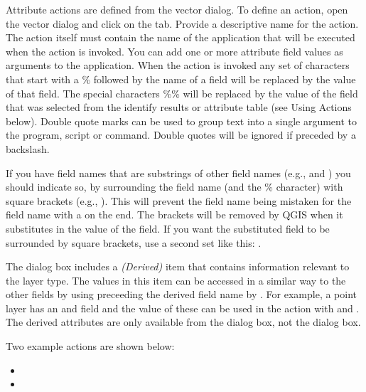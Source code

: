 Attribute actions are defined from the vector  dialog. To
define an action, open the vector  dialog and click on the
 tab. Provide a descriptive name for the action. The action
itself must contain the name of the application that will be executed when the
action is invoked. You can add one or more attribute field values as arguments
to the application. When the action is invoked any set of characters that
start with a \% followed by the name of a field will be replaced by the value of
that field. The special characters \%\% \index{\%\%}will be replaced by the value
of the field that was selected from the identify results or attribute table (see
Using Actions below).  Double quote marks can be used to group text into a
single argument to the program, script or command. Double quotes will be
ignored if preceded by a backslash.

If you have field names that are substrings of other field names (e.g., 
and ) you should
indicate so, by surrounding the field name (and the \% character) with square
brackets (e.g., \usertext{[\%col10]}). This will prevent the  field
name being mistaken for the  field name with a 
on the end. The brackets will be removed by QGIS when it substitutes in the
value of the field. If you want the substituted field to be surrounded by square
brackets, use a second set like this: \usertext{[[\%col10]]}.

The  dialog box includes a {\em (Derived)} item that
contains information relevant to the layer type. The
values in this item can be accessed in a similar way to the other fields
by using preceeding the derived field name by . For
example, a point layer has an  and  field and the
value of these can be used in the action with  and
. The derived attributes are only available from the
 dialog box, not the  dialog box.

Two example actions are shown below:

\begin{itemize}
  \item {}
  \item {}
\end{itemize}

